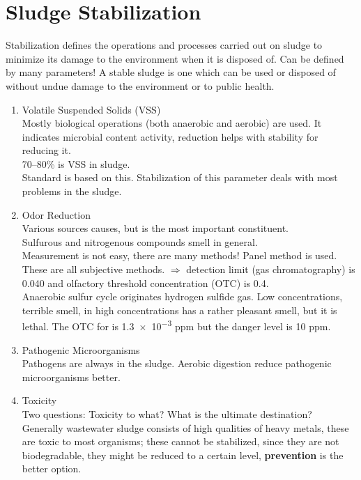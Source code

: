\documentclass{article}
\numberwithin{equation}{section}
\begin{document}
\section{Sludge Stabilization}
Stabilization defines the operations and processes carried out on sludge to minimize its damage to the environment when it is disposed of. Can be defined by many parameters! A stable sludge is one which can be used or disposed of without undue damage to the environment or to public health.
\begin{enumerate}
    \item Volatile Suspended Solids (VSS)\\
    Mostly biological operations (both anaerobic and aerobic) are used. It indicates microbial content activity, reduction helps with stability for reducing it.\\
    70--80\% is VSS in sludge.\\
    Standard is based on this. Stabilization of this parameter deals with most problems in the sludge.
    \item Odor Reduction\\
    Various sources causes, but  is the most important constituent.\\
    Sulfurous and nitrogenous compounds smell in general.\\
    Measurement is not easy, there are many methods! Panel method is used. These are all subjective methods.
     $\Rightarrow$ detection limit (gas chromatography) is 0.040 and olfactory threshold concentration (OTC) is 0.4.\\
    Anaerobic sulfur cycle originates hydrogen sulfide gas. Low concentrations, terrible smell, in high concentrations  has a rather pleasant smell, but it is lethal.
    The OTC for  is \num{1.3e-3} ppm but the danger level is 10 ppm.
    \item Pathogenic Microorganisms\\
    Pathogens are always in the sludge. Aerobic digestion reduce pathogenic microorganisms better.
    \item Toxicity\\
    Two questions: Toxicity to what? What is the  ultimate destination?\\
    Generally wastewater sludge consists of high qualities of heavy metals, these are toxic to most organisms; these cannot be stabilized, since they are not biodegradable, they might be reduced to a certain level, \textbf{prevention} is the better option.\\

\end{enumerate}
\end{document}
